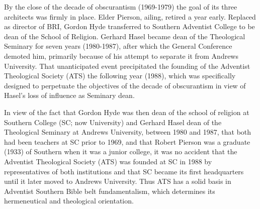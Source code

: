 By the close of the decade of obscurantism (1969-1979) the goal of its three
architects was firmly in place. Elder Pierson, ailing, retired a year early.
Replaced as director of BRI, Gordon Hyde transferred to Southern Adventist
College to be dean of the School of Religion. Gerhard Hasel became dean of
the Theological Seminary for seven years (1980-1987), after which the
General Conference demoted him, primarily because of his attempt to separate
it from Andrews University.
That unanticipated event precipitated the
founding of the Adventist Theological Society (ATS) the following year
(1988), which was specifically designed to perpetuate the objectives of the
decade of obscurantism in view of Hasel's loss of influence as Seminary
dean.

In view of the fact that Gordon Hyde was then dean of the school of religion
at Southern College (SC; now University) and Gerhard Hasel dean
of the Theological Seminary at Andrews University, between 1980 and 1987,
that both had been teachers at SC prior to 1969, and that Robert Pierson
was a graduate (1933) of Southern when it was a junior college, it was no
accident that the Adventist Theological Society (ATS) was founded at SC in
1988 by representatives of both institutions and that SC became its first
headquarters until it later moved to Andrews University. Thus ATS has a
solid basis in Adventist Southern Bible belt fundamentalism, which
determines its hermeneutical and theological orientation.

